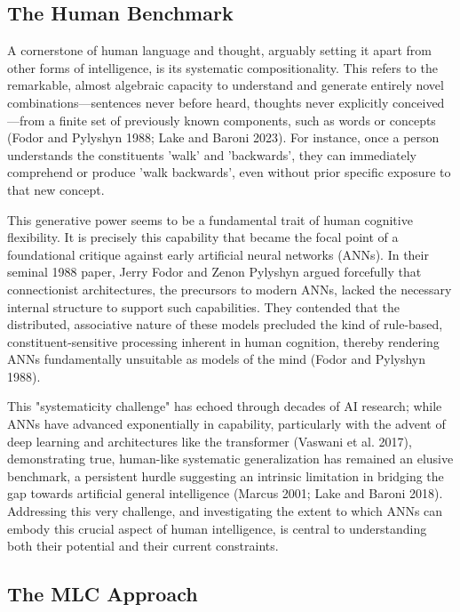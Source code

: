 \documentclass[
10pt, %
a4paper, %
oneside, %
headinclude,footinclude, %
BCOR5mm, %
]{scrartcl}
\begin{document}
\subsection{The Human Benchmark}

A cornerstone of human language and thought, arguably setting it apart from other forms of intelligence, is its systematic compositionality. This refers to the remarkable, almost algebraic capacity to understand and generate entirely novel combinations—sentences never before heard, thoughts never explicitly conceived—from a finite set of previously known components, such as words or concepts (Fodor and Pylyshyn 1988; Lake and Baroni 2023). For instance, once a person understands the constituents 'walk' and 'backwards', they can immediately comprehend or produce 'walk backwards', even without prior specific exposure to that new concept. 

This generative power seems to be a fundamental trait of human cognitive flexibility. It is precisely this capability that became the focal point of a foundational critique against early artificial neural networks (ANNs). In their seminal 1988 paper, Jerry Fodor and Zenon Pylyshyn argued forcefully that connectionist architectures, the precursors to modern ANNs, lacked the necessary internal structure to support such capabilities. They contended that the distributed, associative nature of these models precluded the kind of rule-based, constituent-sensitive processing inherent in human cognition, thereby rendering ANNs fundamentally unsuitable as models of the mind (Fodor and Pylyshyn 1988). 

This "systematicity challenge" has echoed through decades of AI research; while ANNs have advanced exponentially in capability, particularly with the advent of deep learning and architectures like the transformer (Vaswani et al. 2017), demonstrating true, human-like systematic generalization has remained an elusive benchmark, a persistent hurdle suggesting an intrinsic limitation in bridging the gap towards artificial general intelligence (Marcus 2001; Lake and Baroni 2018). Addressing this very challenge, and investigating the extent to which ANNs can embody this crucial aspect of human intelligence, is central to understanding both their potential and their current constraints.

\subsection{The MLC Approach}
\end{document}
